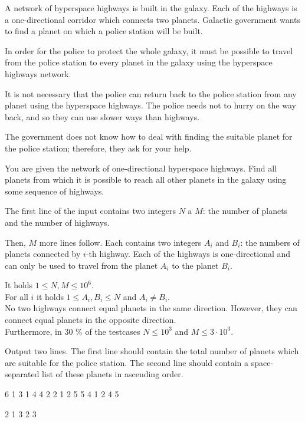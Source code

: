 





A network of hyperspace highways is built in the galaxy. Each of the highways
is a one-directional corridor which connects two planets. Galactic government
wants to find a planet on which a police station will be built.

In order for the police to protect the whole galaxy, it must be possible to
travel from the police station to every planet in the galaxy using the
hyperspace highways network.

It is not necessary that the police can return back to the police station from
any planet using the hyperspace highways. The police needs not to hurry on the
way back, and so they can use slower ways than highways.

The government does not know how to deal with finding the suitable planet for
the police station; therefore, they ask for your help.


You are given the network of one-directional hyperspace highways. Find all
planets from which it is possible to reach all other planets in the galaxy using
some sequence of highways.


The first line of the input contains two integers $N$ a $M$: the number of
planets and the number of highways.

Then, $M$ more lines follow. Each contains two integers $A_i$ and $B_i$: the
numbers of planets connected by $i$-th highway. Each of the highways is
one-directional and can only be used to travel from the planet $A_i$ to the
planet $B_i$.

\bigskip
\noindent
It holds $1 \leq N, M \leq 10^6$.\\
For all $i$ it holds $1 \leq A_i, B_i \leq N$ and $A_i \neq B_i$.\\
No two highways connect equal planets in the same direction. However, they can
  connect equal planets in the opposite direction.\\
Furthermore, in 30 \% of the testcases $N \leq 10^3$ and $M \leq 3 \cdot 10^3$.


Output two lines. The first line should contain the total number of planets
which are suitable for the police station. The second line should contain
a space-separated list of these planets in ascending order.


 6
1 3
1 4
4 2
2 1
2 5
5 4
1 2 4 5
\sampleEND

 2
1 3
2 3
~
\sampleEND


